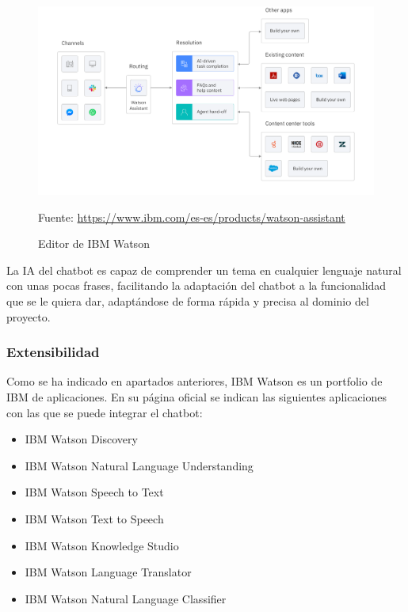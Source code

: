 \begin{figure}[h]
\centering
\includegraphics[width=1.0\textwidth]{imagenes/02_EstadoDelArte/editor_IBM_Watson.png}
\begin{center}
Fuente: \url{https://www.ibm.com/es-es/products/watson-assistant}
\end{center}
\caption{Editor de IBM Watson}
\end{figure}

La IA del chatbot es capaz de comprender un tema en cualquier lenguaje natural con unas pocas frases, facilitando la adaptación del chatbot a la funcionalidad que se le quiera dar, adaptándose de forma rápida y precisa al dominio del proyecto.

\subsubsection*{Extensibilidad}

Como se ha indicado en apartados anteriores, IBM Watson es un \gls{portfolio} de IBM de aplicaciones. En su página oficial \cite{RefWorks:RefID:19-2021productos} se indican las siguientes aplicaciones con las que se puede integrar el chatbot:

\begin{itemize}
\item IBM Watson Discovery
\item IBM Watson Natural Language Understanding
\item IBM Watson Speech to Text
\item IBM Watson Text to Speech
\item IBM Watson Knowledge Studio
\item IBM Watson Language Translator
\item IBM Watson Natural Language Classifier
\end{itemize}

